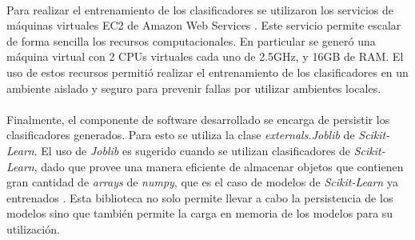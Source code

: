 \paragraph{} Para realizar el entrenamiento de los clasificadores se utilizaron los servicios de máquinas virtuales EC2 de Amazon Web Services \cite{aws}.
Este servicio permite escalar de forma sencilla los recursos computacionales.
En particular se generó una máquina virtual con 2 CPUs virtuales cada uno de 2.5GHz, y 16GB de RAM.
El uso de estos recursos permitió realizar el entrenamiento de los clasificadores en un ambiente aislado y seguro para prevenir fallas por utilizar ambientes locales. 

\paragraph{} Finalmente, el componente de software desarrollado se encarga de persistir los clasificadores generados.
Para esto se utiliza la clase \textit{externals.Joblib} de \textit{Scikit-Learn}.
El uso de \textit{Joblib} es sugerido cuando se utilizan clasificadores de \textit{Scikit-Learn}, dado que provee una manera eficiente de almacenar objetos que contienen gran cantidad de \textit{arrays} de \textit{numpy}\cite{numpy}, que es el caso de modelos de \textit{Scikit-Learn} ya entrenados \cite{persistence}.
Esta biblioteca no solo permite llevar a cabo la persistencia de los modelos sino que también permite la carga en memoria de los modelos para su utilización.

